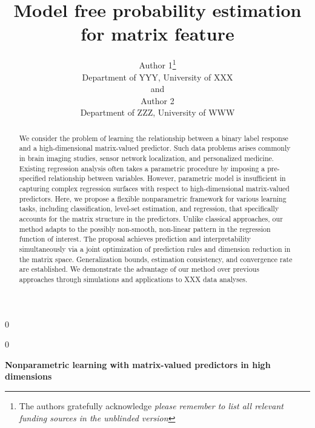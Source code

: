 \documentclass[12pt]{article}
\newcommand{\blind}{0}
\begin{document}
\setcounter{secnumdepth}{3}
%

\def\spacingset#1{\renewcommand{\baselinestretch}%
{#1}\small\normalsize} \spacingset{1}



\blind
{
  \title{\bf Model free probability estimation for matrix feature}
  \author{Author 1\thanks{
    The authors gratefully acknowledge \textit{please remember to list all relevant funding sources in the unblinded version}}\hspace{.2cm}\\
    Department of YYY, University of XXX\\
    and \\
    Author 2 \\
    Department of ZZZ, University of WWW}
  \maketitle
} \fi

\blind
{
  \bigskip
  \bigskip
  \bigskip
  \begin{center}
    {\LARGE\bf Nonparametric learning with matrix-valued predictors in high dimensions}
\end{center}
  \medskip
} \fi

\bigskip
\begin{abstract}
We consider the problem of learning the relationship between a binary label response and a high-dimensional matrix-valued predictor. Such data problems arises commonly in brain imaging studies, sensor network localization, and personalized medicine. Existing regression analysis often takes a parametric procedure by imposing a pre-specified relationship between variables. However, parametric model is insufficient in capturing complex regression surfaces with respect to high-dimensional matrix-valued predictors. Here, we propose a flexible nonparametric framework for various learning tasks, including classification, level-set estimation, and regression, that specifically accounts for the matrix structure in the predictors. Unlike classical approaches, our method adapts to the possibly non-smooth, non-linear pattern in the regression function of interest. The proposal achieves prediction and interpretability simultaneously via a joint optimization of prediction rules and dimension reduction in the matrix space. Generalization bounds, estimation consistency, and convergence rate are established. We demonstrate the advantage of our method over previous approaches through simulations and applications to {\color{red}XXX} data analyses. 
\end{abstract}
\end{document}
